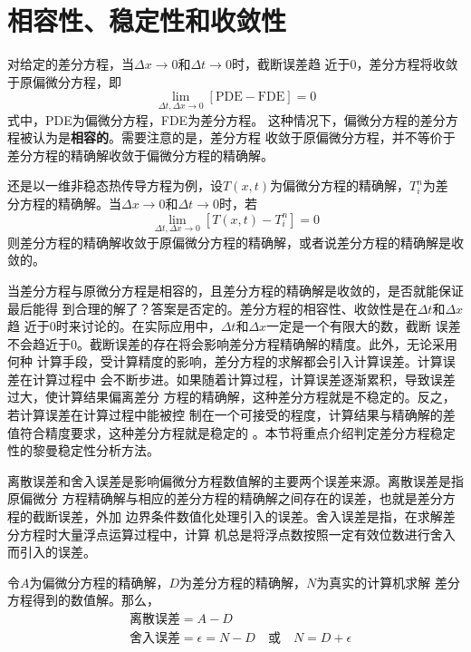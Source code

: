 \section{相容性、稳定性和收敛性}
对给定的差分方程，当$\Delta x \rightarrow 0$和$\Delta t \rightarrow 0$时，截断误差趋
近于0，差分方程将收敛于原偏微分方程，即
\begin{equation}
  \lim_{\Delta t,\Delta x\rightarrow 0}[\mathrm{PDE} - \mathrm{FDE}] = 0
\end{equation}
式中，PDE为偏微分方程，FDE为差分方程。
这种情况下，偏微分方程的差分方程被认为是\textbf{相容的}。需要注意的是，差分方程
收敛于原偏微分方程，并不等价于差分方程的精确解收敛于偏微分方程的精确解。

还是以一维非稳态热传导方程为例，设$T(x,t)$为偏微分方程的精确解，$T_{i}^{n}$为差
分方程的精确解。当$\Delta x \rightarrow 0$和$\Delta t \rightarrow 0$时，若
\begin{equation}
  \lim_{\Delta t,\Delta x\rightarrow 0}[T(x,t) - T_{i}^{n}] = 0
\end{equation}
则差分方程的精确解收敛于原偏微分方程的精确解，或者说差分方程的精确解是收敛的。

当差分方程与原微分方程是相容的，且差分方程的精确解是收敛的，是否就能保证最后能得
到合理的解了？答案是否定的。差分方程的相容性、收敛性是在$\Delta t$和$\Delta x$趋
近于0时来讨论的。在实际应用中，$\Delta t$和$\Delta x$一定是一个有限大的数，截断
误差不会趋近于0。截断误差的存在将会影响差分方程精确解的精度。此外，无论采用何种
计算手段，受计算精度的影响，差分方程的求解都会引入计算误差。计算误差在计算过程中
会不断步进。如果随着计算过程，计算误差逐渐累积，导致误差过大，使计算结果偏离差分
方程的精确解，这种差分方程就是不稳定的。反之，若计算误差在计算过程中能被控
制在一个可接受的程度，计算结果与精确解的差值符合精度要求，这种差分方程就是稳定的
。本节将重点介绍判定差分方程稳定性的黎曼稳定性分析方法。

离散误差和舍入误差是影响偏微分方程数值解的主要两个误差来源。离散误差是指原偏微分
方程精确解与相应的差分方程的精确解之间存在的误差，也就是差分方程的截断误差，外加
边界条件数值化处理引入的误差。舍入误差是指，在求解差分方程时大量浮点运算过程中，计算
机总是将浮点数按照一定有效位数进行舍入而引入的误差。

令$A$为偏微分方程的精确解，$D$为差分方程的精确解，$N$为真实的计算机求解
差分方程得到的数值解。那么，
\begin{equation}
  \begin{aligned}
  &\mbox{离散误差} = A - D
  \\
  &\mbox{舍入误差} = \epsilon = N - D
  \quad
  \mbox{或}
  \quad
  N = D + \epsilon
  \end{aligned}
  \label{EqBD_Errors}
\end{equation}

